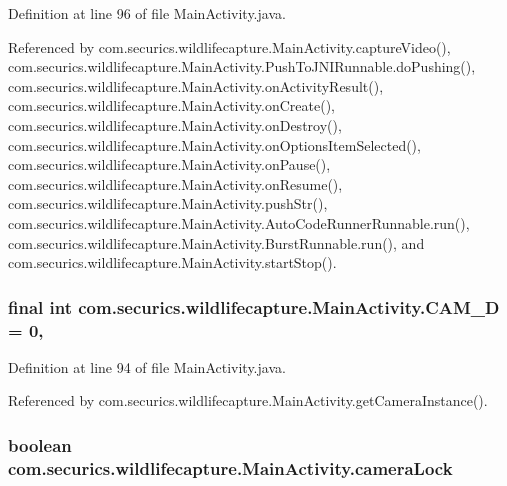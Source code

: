 Definition at line 96 of file Main\+Activity.\+java.



Referenced by com.\+securics.\+wildlifecapture.\+Main\+Activity.\+capture\+Video(), com.\+securics.\+wildlifecapture.\+Main\+Activity.\+Push\+To\+J\+N\+I\+Runnable.\+do\+Pushing(), com.\+securics.\+wildlifecapture.\+Main\+Activity.\+on\+Activity\+Result(), com.\+securics.\+wildlifecapture.\+Main\+Activity.\+on\+Create(), com.\+securics.\+wildlifecapture.\+Main\+Activity.\+on\+Destroy(), com.\+securics.\+wildlifecapture.\+Main\+Activity.\+on\+Options\+Item\+Selected(), com.\+securics.\+wildlifecapture.\+Main\+Activity.\+on\+Pause(), com.\+securics.\+wildlifecapture.\+Main\+Activity.\+on\+Resume(), com.\+securics.\+wildlifecapture.\+Main\+Activity.\+push\+Str(), com.\+securics.\+wildlifecapture.\+Main\+Activity.\+Auto\+Code\+Runner\+Runnable.\+run(), com.\+securics.\+wildlifecapture.\+Main\+Activity.\+Burst\+Runnable.\+run(), and com.\+securics.\+wildlifecapture.\+Main\+Activity.\+start\+Stop().

\subsubsection[{C\+A\+M\+\_\+3\+D}]{\setlength{\rightskip}{0pt plus 5cm}final int com.\+securics.\+wildlifecapture.\+Main\+Activity.\+C\+A\+M\+\_\+D = 0\hspace{0.3cm}{\ttfamily [static]}, {\ttfamily [private]}}\label{classcom_1_1securics_1_1wildlifecapture_1_1_main_activity_aaab96c4eaf51003350daa6b71fd28899}


Definition at line 94 of file Main\+Activity.\+java.



Referenced by com.\+securics.\+wildlifecapture.\+Main\+Activity.\+get\+Camera\+Instance().

\subsubsection[{camera\+Lock}]{\setlength{\rightskip}{0pt plus 5cm}boolean com.\+securics.\+wildlifecapture.\+Main\+Activity.\+camera\+Lock\hspace{0.3cm}{\ttfamily [private]}}\label{classcom_1_1securics_1_1wildlifecapture_1_1_main_activity_a2edbb748bf878070282353cbd0b378f2}


